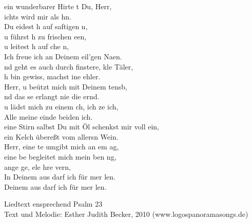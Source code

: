 
ein wunderbarer Hirte t Du, Herr,\\
ichts wird mir als hn.\\
Du eidest h auf saftigen n,\\
u führst h zu frischen een,\\
u leitest h auf che n,\\
Ich freue ich an Deinem eil'gen Naen.\\

nd geht es auch durch finstere, kle Täler,\\
h bin gewiss,  machst ine ehler.\\
Herr, u beützt mich mit Deinem tensb,\\
nd das se erlangt nie die ernd.\\
u lädst mich  zu einem ch, ich ze ich,\\
Alle meine einde beiden ich.\\

eine Stirn salbst Du mit Öl  schenkst mir voll ein,\\
ein Kelch übereßt vom allersn Wein.\\
Herr, eine te umgibt mich an em ag,\\
eine be begleitet mich mein ben ng,\\
ange ge, ele hre vern,\\
In Deinem aus darf ich für mer len.\\
 Deinem aus darf ich für mer len.\\

\begin{footnotesize}
Liedtext ensprechend Psalm 23\\
Text und Melodie: Esther Judith Becker, 2010 (www.logospanoramasongs.de)
\end{footnotesize}